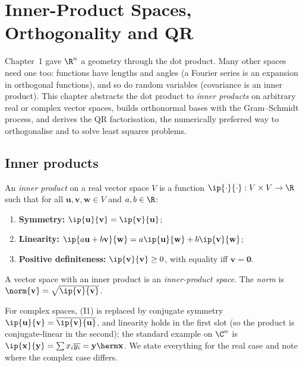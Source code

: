 \chapter{Inner-Product Spaces, Orthogonality and QR}

Chapter~1 gave $\R^n$ a geometry through the dot product. Many other spaces need one too: functions have lengths and angles (a Fourier series is an expansion in orthogonal functions), and so do random variables (covariance is an inner product). This chapter abstracts the dot product to \emph{inner products} on arbitrary real or complex vector spaces, builds orthonormal bases with the Gram--Schmidt process, and derives the QR factorisation, the numerically preferred way to orthogonalise and to solve least squares problems.

\section{Inner products}

\begin{definition}
An \emph{inner product} on a real vector space $V$ is a function $\ip{\cdot}{\cdot}:V\times V\to\R$ such that for all $\mathbf{u},\mathbf{v},\mathbf{w}\in V$ and $a,b\in\R$:
\begin{enumerate}[label=(I\arabic*)]
  \item \textbf{Symmetry:} $\ip{\mathbf{u}}{\mathbf{v}}=\ip{\mathbf{v}}{\mathbf{u}}$;
  \item \textbf{Linearity:} $\ip{a\mathbf{u}+b\mathbf{v}}{\mathbf{w}}=a\ip{\mathbf{u}}{\mathbf{w}}+b\ip{\mathbf{v}}{\mathbf{w}}$;
  \item \textbf{Positive definiteness:} $\ip{\mathbf{v}}{\mathbf{v}}\ge0$, with equality iff $\mathbf{v}=\mathbf{0}$.
\end{enumerate}
A vector space with an inner product is an \emph{inner-product space}. The \emph{norm} is $\norm{\mathbf{v}}=\sqrt{\ip{\mathbf{v}}{\mathbf{v}}}$.
\end{definition}

For complex spaces, (I1) is replaced by conjugate symmetry $\ip{\mathbf{u}}{\mathbf{v}}=\overline{\ip{\mathbf{v}}{\mathbf{u}}}$, and linearity holds in the first slot (so the product is conjugate-linear in the second); the standard example on $\C^n$ is $\ip{\mathbf{x}}{\mathbf{y}}=\sum x_i\overline{y_i}=\mathbf{y}\herm\mathbf{x}$. We state everything for the real case and note where the complex case differs.

